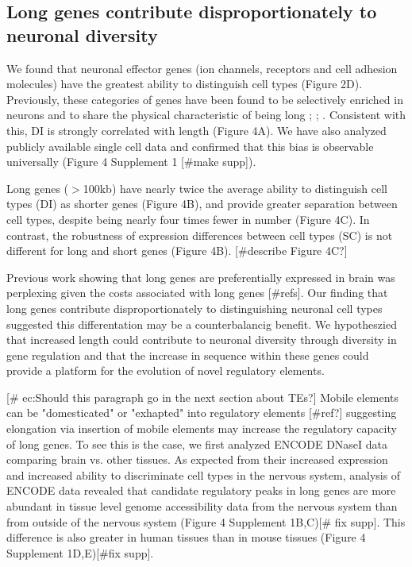 \subsection{Long genes contribute disproportionately to neuronal diversity}

We found that neuronal effector genes (ion channels, receptors and cell adhesion molecules) have the greatest ability to distinguish cell types (Figure 2D). Previously, these categories of genes have been found to be selectively enriched in neurons and to share the physical characteristic of being long \cite{Sugino_2014}; \cite{Gabel_2015}; \cite{Zylka_2015}. Consistent with this, DI is strongly correlated with length (Figure 4A). We have also analyzed publicly available single cell data and confirmed that this bias is observable universally (Figure 4 Supplement 1 [#make supp]). 

Long genes ($\gt$100kb) have nearly twice the average ability to distinguish cell types (DI) as shorter genes (Figure 4B), and provide greater separation between cell types, despite being nearly four times fewer in number (Figure 4C). In contrast, the robustness of expression differences between cell types (SC) is not different for long and short genes (Figure 4B). [#describe Figure 4C?] 

Previous work showing that long genes are preferentially expressed in brain was perplexing given the costs associated with long genes [#refs]. Our finding that long genes contribute disproportionately to distinguishing neuronal cell types suggested this differentation may be a counterbalancig benefit. We hypotheszied that increased length could contribute to neuronal diversity through diversity in gene regulation and that the increase in sequence within these genes could provide a platform for the evolution of novel regulatory elements.

[# ec:Should this paragraph go in the next section about TEs?] Mobile elements can be "domesticated" or "exhapted" into regulatory elements [#ref?] suggesting elongation via insertion of mobile elements may increase the regulatory capacity of long genes. To see this is the case, we first analyzed ENCODE DNaseI data comparing brain vs. other tissues. As expected from their increased expression and increased ability to discriminate cell types in the nervous system, analysis of ENCODE data revealed that candidate regulatory peaks in long genes are more abundant in tissue level genome accessibility data from the nervous system than from outside of the nervous system (Figure 4 Supplement 1B,C)[# fix supp]. This difference is also greater in human tissues than in mouse tissues (Figure 4 Supplement 1D,E)[#fix supp]. 

